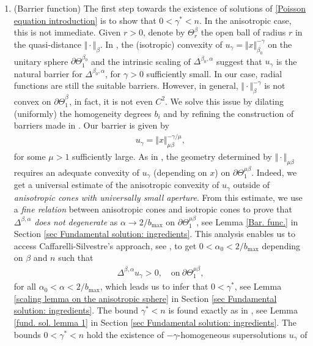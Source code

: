 \documentclass[10pt, leqno]{article}
\theoremstyle{definition}
\theoremstyle{remark}
\numberwithin{equation}{section}
\begin{document}
\begin{enumerate}
\item(Barrier function) The first step towards the existence of solutions of \eqref{Poisson equation introduction} is to show that $0 < \gamma^{\ast} < n$. In the anisotropic case, this is not immediate. Given $r> 0$, denote by $\Theta^{\beta}_{r}$ the open ball of radius $r$ in the quasi-distance $\Vert \cdot \Vert_{\beta}$. In \cite{CWW}, the (isotropic) convexity of $u_{\gamma} = \Vert  x \Vert_{\beta_{0}}^{-\gamma}$ on the unitary sphere $\partial \Theta^{\beta_{0}}_{1}$ and the intrinsic scaling of $\Delta^{\beta_{0}, \alpha}$ suggest that $u_{\gamma}$ is the natural barrier for $\Delta^{\beta_{0}, \alpha}$, for $\gamma >0$ sufficiently small. In our case, radial functions are still the suitable barriers. However, in general, $\Vert \cdot \Vert^{-\gamma}_{\beta}$ is not convex on $\partial \Theta^{\beta_{}}_{1}$, in fact, it is not even $C^{2}$. We solve this issue by dilating (uniformly) the homogeneity degrees $b_{i}$ and by refining the construction of barriers made in \cite{LEITAO LP}. Our barrier is given by
\begin{eqnarray}
u_{\gamma} = \Vert x \Vert_{\mu \beta}^{-\gamma/\mu},
\end{eqnarray}
for some $\mu > 1$ sufficiently large. As in \cite{LEITAO LP}, the geometry determined by $\Vert \cdot \Vert_{\mu \beta}$ requires an adequate convexity of $u_{\gamma}$ (depending on $x$) on $\partial \Theta^{\mu \beta}_{1}$. Indeed, we get a universal estimate of the anisotropic convexity of $u_{\gamma}$ outside of \textit{anisotropic cones with universally small aperture}. From this estimate, we use a \textit{fine relation} between anisotropic cones and isotropic cones to prove that $\Delta^{\beta, \alpha}$ \textit{does not degenerate} as $\alpha \rightarrow 2/b_{\max}$ on $\partial \Theta^{\mu \beta}_{1}$, see Lemma \ref{Bar. func.} in Section \ref{sec Fundamental solution: ingredients}. This analysis enables us to access Caffarelli-Silvestre's approach, see \cite{CS}, to get $0 < \alpha_{0} < 2/b_{\max}$ depending on $\beta$ and $n$ such that
\begin{eqnarray}
\Delta^{\beta, \alpha} u_{\gamma} > 0, \quad \text{on} \ \partial\Theta^{\mu \beta}_{1},
\end{eqnarray}
for all $\alpha_{0} < \alpha < 2/b_{\max}$, which leads us to infer that $0 < \gamma^{\ast}$, see Lemma \ref{scaling lemma on the anisotropic sphere} in Section \ref{sec Fundamental solution: ingredients}. The bound $\gamma^{\ast} < n$ is found exactly as in \cite{CWW}, see Lemma \ref{fund. sol. lemma 1} in Section \ref{sec Fundamental solution: ingredients}. The bounds $0 < \gamma^{\ast} < n$ hold the existence of $-\gamma$-homogeneous supersolutions $u_{\gamma}$ of

\end{enumerate}
\end{document}
